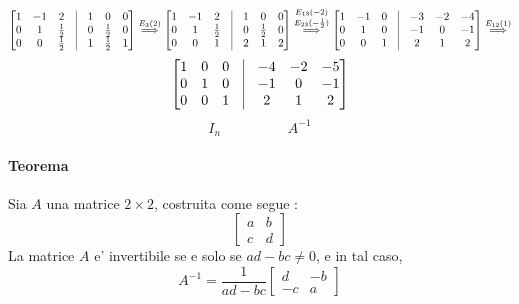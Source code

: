 \documentclass[a4paper, 10pt]{article}
\begin{document}
	\[
		\begin{bmatrix}
		1 & -1 & 2 & \vrule{} & 1 & 0 & 0\\
		0 & 1 & \frac{1}{2} & \vrule{} & 0 & \frac{1}{2} & 0\\
		0 & 0 & \frac{1}{2} & \vrule{} & 1 & \frac{1}{2} & 1
		\end{bmatrix} 
		\stackrel{E_{3}(2)}{\Longrightarrow}
		\begin{bmatrix}
		1 & -1 & 2 & \vrule{} & 1 & 0 & 0\\
		0 & 1 & \frac{1}{2} & \vrule{} & 0 & \frac{1}{2} & 0\\
		0 & 0 & 1 & \vrule{} & 2 & 1 & 2
		\end{bmatrix} 
		\stackrel{E_{13}(-2)}{\stackrel{E_{23}(-\frac{1}{2})}{\Longrightarrow}}
		\begin{bmatrix}
		1 & -1 & 0 & \vrule{} & -3 & -2 & -4\\
		0 & 1 & 0 & \vrule{} & -1 & 0 & -1\\
		0 & 0 & 1 & \vrule{} & 2 & 1 & 2
		\end{bmatrix}
		\stackrel{E_{12}(1)}{\Longrightarrow}
	\]
	\[
		\begin{bmatrix}
		1 & 0 & 0 & \vrule{} & -4 & -2 & -5\\
		0 & 1 & 0 & \vrule{} & -1 & 0 & -1\\
		0 & 0 & 1 & \vrule{} & 2 & 1 & 2
		\end{bmatrix}
	\]
	\[
		I_{n} \hspace{2cm} A^{-1}
	\]
	\paragraph*{Teorema} Sia $A$ una matrice $2 \times 2$, costruita come segue :
	\[
		\begin{bmatrix}
			a & b \\
			c & d
		\end{bmatrix}
	\]
	La matrice $A$ e' invertibile se e solo se  $ad - bc \neq 0$, e in tal caso, 
	\[ A^{-1} = \frac{1}{ad-bc}\begin{bmatrix} d & -b \\ -c & a \end{bmatrix} \]
	
\end{document}
